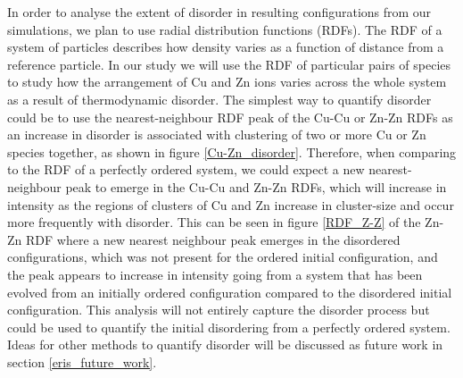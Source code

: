In order to analyse the extent of disorder in resulting configurations from our simulations, we plan to use radial distribution functions (RDFs). The RDF of a system of particles describes how density varies as a function of distance from a reference particle. In our study we will use the RDF of particular pairs of species to study how the arrangement of Cu and Zn ions varies across the whole system as a result of thermodynamic disorder.
The simplest way to quantify disorder could be to use the nearest-neighbour RDF peak of the Cu-Cu or Zn-Zn RDFs as an increase in disorder is associated with clustering of two or more Cu or Zn species together, as shown in figure \ref{Cu-Zn_disorder}. Therefore, when comparing to the RDF of a perfectly ordered system, we could expect a new nearest-neighbour peak to emerge in the Cu-Cu and Zn-Zn RDFs, which will increase in intensity as the regions of clusters of Cu and Zn increase in cluster-size and occur more frequently with disorder. This can be seen in figure \ref{RDF_Z-Z} of the Zn-Zn RDF where a new nearest neighbour peak emerges in the disordered configurations, which was not present for the ordered initial configuration, and the peak appears to increase in intensity going from a system that has been evolved from an initially ordered configuration compared to the disordered initial configuration. This analysis will not entirely capture the disorder process but could be used to quantify the initial disordering from a perfectly ordered system. Ideas for other methods to quantify disorder will be discussed as future work in section \ref{eris_future_work}.

